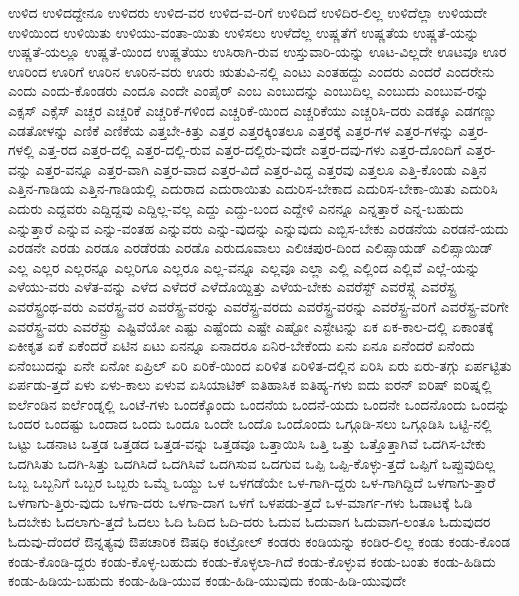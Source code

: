 {ಉಳಿದ
ಉಳಿದದ್ದೇನೂ
ಉಳಿದರು
ಉಳಿದ-ವರ
ಉಳಿದ-ವ-ರಿಗೆ
ಉಳಿದಿದೆ
ಉಳಿದಿರ-ಲಿಲ್ಲ
ಉಳಿದೆಲ್ಲಾ
ಉಳಿಯದೇ
ಉಳಿಯಿಂದ
ಉಳಿಯಿತು
ಉಳಿಯು-ವಂತಾ-ಯಿತು
ಉಳಿಸಲು
ಉಳೆದೆಲ್ಲ
ಉಷ್ಣತೆಗೆ
ಉಷ್ಣತೆಯ
ಉಷ್ಣತೆ-ಯನ್ನು
ಉಷ್ಣತೆ-ಯಲ್ಲೂ
ಉಷ್ಣತೆ-ಯಿಂದ
ಉಷ್ಣತೆಯು
ಉಸಿರಾಗಿ-ರುವ
ಉಸ್ತುವಾರಿ-ಯನ್ನು
ಊಟ-ವಿಲ್ಲದೇ
ಊಟವೂ
ಊರ
ಊರಿಂದ
ಊರಿಗೆ
ಊರಿನ
ಊರಿನ-ವರು
ಊರು
ಋತುವಿ-ನಲ್ಲಿ
ಎಂಟು
ಎಂತಹದ್ದು
ಎಂದರು
ಎಂದರೆ
ಎಂದರೇನು
ಎಂದು
ಎಂದು-ಕೊಂಡರು
ಎಂದೂ
ಎಂದೇ
ಎಂಪೈರ್
ಎಂಬ
ಎಂಬುದನ್ನು
ಎಂಬುದಿಲ್ಲ
ಎಂಬುದು
ಎಂಬುವ-ರನ್ನು
ಎಕ್ಸಸ್
ಎಕ್ಸೆಸ್
ಎಚ್ಚರ
ಎಚ್ಚರಿಕೆ
ಎಚ್ಚರಿಕೆ-ಗಳಿಂದ
ಎಚ್ಚರಿಕೆ-ಯಿಂದ
ಎಚ್ಚರಿಕೆಯು
ಎಚ್ಚರಿಸಿ-ದರು
ಎಡಕ್ಕೂ
ಎಡಗಣ್ಣು
ಎಡತೋಳನ್ನು
ಎಣಿಕೆ
ಎಣಿಕೆಯ
ಎತ್ತಬೇ-ಕಿತ್ತು
ಎತ್ತರ
ಎತ್ತರಕ್ಕಿಂತಲೂ
ಎತ್ತರಕ್ಕೆ
ಎತ್ತರ-ಗಳ
ಎತ್ತರ-ಗಳನ್ನು
ಎತ್ತರ-ಗಳಲ್ಲಿ
ಎತ್ತ-ರದ
ಎತ್ತರ-ದಲ್ಲಿ
ಎತ್ತರ-ದಲ್ಲಿ-ರುವ
ಎತ್ತರ-ದಲ್ಲಿರು-ವುದೇ
ಎತ್ತರ-ದವು-ಗಳು
ಎತ್ತರ-ದೊಂದಿಗೆ
ಎತ್ತರ-ವನ್ನು
ಎತ್ತರ-ವನ್ನೂ
ಎತ್ತರ-ವಾಗಿ
ಎತ್ತರ-ವಾದ
ಎತ್ತರ-ವಿದೆ
ಎತ್ತರ-ವಿದ್ದ
ಎತ್ತರವು
ಎತ್ತಲೂ
ಎತ್ತಿ-ಕೊಂಡು
ಎತ್ತಿನ
ಎತ್ತಿನ-ಗಾಡಿಯ
ಎತ್ತಿನ-ಗಾಡಿಯಲ್ಲಿ
ಎದುರಾದ
ಎದುರಾಯಿತು
ಎದುರಿಸ-ಬೇಕಾದ
ಎದುರಿಸ-ಬೇಕಾ-ಯಿತು
ಎದುರಿಸಿ
ಎದುರು
ಎದ್ದವರು
ಎದ್ದಿದ್ದವು
ಎದ್ದಿಲ್ಲ-ವಲ್ಲ
ಎದ್ದು
ಎದ್ದು-ಬಂದ
ಎದ್ದೇಳಿ
ಎನನ್ನೂ
ಎನ್ನತ್ತಾರೆ
ಎನ್ನ-ಬಹುದು
ಎನ್ನುತ್ತಾರೆ
ಎನ್ನುವ
ಎನ್ನು-ವಂತಹ
ಎನ್ನುವರು
ಎನ್ನು-ವುದನ್ನು
ಎನ್ನುವುದು
ಎಬ್ಬಿಸ-ಬೇಕು
ಎರಡನೆಯ
ಎರಡನೆ-ಯದು
ಎರಡನೇ
ಎರಡು
ಎರಡೂ
ಎರಡೆರಡು
ಎರಡೊ
ಎರುದೂವಾಲು
ಎಲಿಚಪುರ-ದಿಂದ
ಎಲಿಪ್ಸಾಯಡ್
ಎಲಿಪ್ಸಾಯಿಡ್
ಎಲ್ಲ
ಎಲ್ಲರ
ಎಲ್ಲರನ್ನೂ
ಎಲ್ಲರಿಗೂ
ಎಲ್ಲರೂ
ಎಲ್ಲ-ವನ್ನೂ
ಎಲ್ಲವೂ
ಎಲ್ಲಾ
ಎಲ್ಲಿ
ಎಲ್ಲಿಂದ
ಎಲ್ಲಿವೆ
ಎಲ್ಲೆ-ಯನ್ನು
ಎಳೆಯು-ವರು
ಎಳೆತ-ವನ್ನು
ಎಳೆದ
ಎಳೆದರೆ
ಎಳೆದೊಯ್ದಿತ್ತು
ಎಳೆಯ-ಬೇಕು
ಎವರೆಸ್ಟ್
ಎವರೆಸ್ಟ್ಗೆ
ಎವರೆಸ್ಟ್ರ
ಎವರೆಸ್ಟ್ರಂಥ-ವರು
ಎವರೆಸ್ಟ್ರ-ವರ
ಎವರೆಸ್ಟ್ರ-ವರನ್ನು
ಎವರೆಸ್ಟ್ರ-ವರದು
ಎವರೆಸ್ಟ್ರ-ವರನ್ನು
ಎವರೆಸ್ಟ್ರ-ವರಿಗೆ
ಎವರೆಸ್ಟ್ರ-ವರಿಗೇ
ಎವರೆಸ್ಟ್ರ-ವರು
ಎವರೆಸ್ಟ್ರು
ಎಷ್ಟಿವೆಯೋ
ಎಷ್ಟು
ಎಷ್ಟೆಂದು
ಎಷ್ಟೇ
ಎಷ್ಟೋ
ಎಸ್ಟೇಟನ್ನು
ಏಕ
ಏಕ-ಕಾಲ-ದಲ್ಲಿ
ಏಕಾಂತಕ್ಕೆ
ಏಕೀಕೃತ
ಏಕೆ
ಏಕೆಂದರೆ
ಏಟಿನ
ಏಟು
ಏನನ್ನೂ
ಏನಾದರೂ
ಏನಿರ-ಬೇಕೆಂದು
ಏನು
ಏನೂ
ಏನೆಂದರೆ
ಏನೆಂದು
ಏನೆಂಬುದನ್ನು
ಏನೇ
ಏನೋ
ಏಪ್ರಿಲ್
ಏರಿ
ಏರಿಕೆ-ಯಿಂದ
ಏರಿಳಿತ
ಏರಿಳಿತ-ದಲ್ಲಿನ
ಏರಿಸಿ
ಏರು
ಏರು-ತಗ್ಗು
ಏರ್ಪಟ್ಟಿತು
ಏರ್ಪಡು-ತ್ತದೆ
ಏಳು
ಏಳು-ಕಾಲು
ಏಳುವ
ಏಸಿಯಾಟಿಕ್
ಐತಿಹಾಸಿಕ
ಐತಿಹ್ಯ-ಗಳು
ಐದು
ಐರನ್
ಐರಿಷ್
ಐರಿಷ್ನಲ್ಲಿ
ಐರ್ಲೆಂಡಿನ
ಐರ್ಲೆಂಡ್ನಲ್ಲಿ
ಒಂಟೆ-ಗಳು
ಒಂದಕ್ಕೊಂದು
ಒಂದನೆಯ
ಒಂದನೆ-ಯದು
ಒಂದನೇ
ಒಂದನೊಂದು
ಒಂದನ್ನು
ಒಂದರ
ಒಂದಷ್ಟು
ಒಂದಾದ
ಒಂದು
ಒಂದೂ
ಒಂದೇ
ಒಂದೊ
ಒಂದೊಂದು
ಒಗ್ಗೂಡಿ-ಸಲು
ಒಗ್ಗೂಡಿಸಿ
ಒಟ್ಟಿ-ನಲ್ಲಿ
ಒಟ್ಟು
ಒಡನಾಟ
ಒತ್ತಡ
ಒತ್ತಡದ
ಒತ್ತಡ-ವನ್ನು
ಒತ್ತಡವೂ
ಒತ್ತಾಯಿಸಿ
ಒತ್ತಿ
ಒತ್ತು
ಒತ್ತೊತ್ತಾಗಿವೆ
ಒದಗಿಸ-ಬೇಕು
ಒದಗಿಸಿತು
ಒದಗಿ-ಸಿತ್ತು
ಒದಗಿಸಿದೆ
ಒದಗಿಸಿವೆ
ಒದಗಿಸುವ
ಒದಗುವ
ಒಪ್ಪಿ
ಒಪ್ಪಿ-ಕೊಳ್ಳು-ತ್ತದೆ
ಒಪ್ಪಿಗೆ
ಒಪ್ಪುವುದಿಲ್ಲ
ಒಬ್ಬ
ಒಬ್ಬನಿಗೆ
ಒಬ್ಬರ
ಒಬ್ಬರು
ಒಮ್ಮೆ
ಒಯ್ದು
ಒಳ
ಒಳಗಡೆಯೇ
ಒಳ-ಗಾಗಿ-ದ್ದರು
ಒಳ-ಗಾಗಿದ್ದಿದೆ
ಒಳಗಾಗು-ತ್ತಾರೆ
ಒಳಗಾಗು-ತ್ತಿರು-ವುದು
ಒಳಗಾ-ದರು
ಒಳಗಾ-ದಾಗ
ಒಳಗೆ
ಒಳಪಡು-ತ್ತದೆ
ಒಳ-ಮಾರ್ಗ-ಗಳು
ಓಡಾಟಕ್ಕೆ
ಓಡಿ
ಓದಬೇಕು
ಓದಲಾಗು-ತ್ತದೆ
ಓದಲು
ಓದಿ
ಓದಿದ
ಓದಿ-ದರು
ಓದುವ
ಓದುವಾಗ
ಓದುವಾಗ-ಲಂತೂ
ಓದುವುದರ
ಓದುವು-ದೆಂದರೆ
ಔನ್ನತ್ಯವು
ಔಪಚಾರಿಕ
ಔಷಧಿ
ಕಂಟ್ರೋಲ್
ಕಂಡರು
ಕಂಡಿಯನ್ನು
ಕಂಡಿರ-ಲಿಲ್ಲ
ಕಂಡು
ಕಂಡು-ಕೊಂಡ
ಕಂಡು-ಕೊಂಡಿ-ದ್ದರು
ಕಂಡು-ಕೊಳ್ಳ-ಬಹುದು
ಕಂಡು-ಕೊಳ್ಳಲಾ-ಗಿದೆ
ಕಂಡು-ಕೊಳ್ಳುವ
ಕಂಡು-ಬಂತು
ಕಂಡು-ಹಿಡಿದು
ಕಂಡು-ಹಿಡಿಯ-ಬಹುದು
ಕಂಡು-ಹಿಡಿ-ಯುವ
ಕಂಡು-ಹಿಡಿ-ಯುವುದು
ಕಂಡು-ಹಿಡಿ-ಯುವುದೇ
}
